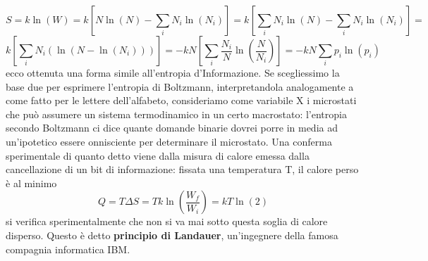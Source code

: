 \documentclass[10pt,a4paper]{article}
\begin{document}
\[S = k\ln(W)=k[N\ln(N)-\sum_iN_i\ln(N_i)]=k\left[\sum_iN_i\ln(N)-\sum_iN_i\ln(N_i)\right]=\]
\[k\left[\sum_iN_i(\ln(N-\ln(N_i)))\right]=-kN\left[\sum_i\frac{N_i}{N}\ln\left(\frac{N}{N_i}\right)\right] =-kN\sum_ip_i\ln(p_i)\]
ecco ottenuta una forma simile all'entropia d'Informazione. Se scegliessimo la base due per esprimere l'entropia di Boltzmann, interpretandola analogamente a come fatto per le lettere dell'alfabeto, consideriamo come variabile X i microstati che può assumere un sistema termodinamico in un certo macrostato: l'entropia secondo Boltzmann ci dice quante domande binarie dovrei porre in media ad un'ipotetico essere onnisciente per determinare il microstato. Una conferma sperimentale di quanto detto viene dalla misura di calore emessa dalla cancellazione di un bit di informazione: fissata una temperatura T, il calore perso è al minimo 
\[Q=T\Delta S=Tk\ln(\frac{W_f}{W_i})=kT\ln(2)  \]
si verifica sperimentalmente che non si va mai sotto questa soglia di calore disperso. Questo è detto \textbf{principio di Landauer}, un'ingegnere della famosa compagnia informatica IBM.
\appendix
\end{document}
